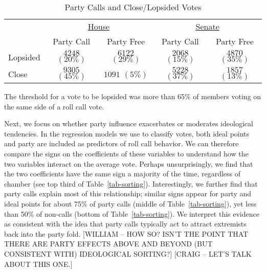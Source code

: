 \documentclass[12pt]{article}
\begin{document}
\begin{table}[!htbp]
\centering
\begin{threeparttable}
\singlespacing
\caption{Party Calls and Close/Lopsided Votes}
\label{tab-close-lop}
\begin{tabular}{l cc|cc}
\hline
&\multicolumn{2}{c}{\underline{House}}&\multicolumn{2}{c}{\underline{Senate}}\\
         & Party Call      & Party Free      & Party Call      & Party Free \\
\hline
Lopsided & $4248$ $(20\%)$ & $6122$ $(29\%)$ & $2068$ $(15\%)$ & $4870$ $(35\%)$ \\
Close    & $9305$ $(45\%)$ & $1091$ $(5\%)$  & $5228$ $(37\%)$ & $1857$ $(13\%)$ \\
\hline
\end{tabular}
\begin{tablenotes}
   \item
   The threshold for a vote to be lopsided was more than 65\% of members voting on the same side of a roll call vote.
 \end{tablenotes}
\end{threeparttable}
\end{table}

Next, we focus on whether party influence exacerbates or moderates ideological tendencies.  In the regression models we use to classify votes, both ideal points and party are included as predictors of roll call behavior.  We can therefore compare the signs on the coefficients of these variables to understand how the two variables interact on the average vote.  Perhaps unsurprisingly, we find that the two coefficients have the same sign a majority of the time, regardless of chamber (see top third of Table~\ref{tab-sorting}).  Interestingly, we further find that party calls explain most of this relationship; similar signs appear for party and ideal points for about 75\% of party calls (middle of Table~\ref{tab-sorting}), yet less than 50\% of non-calls (bottom of Table~\ref{tab-sorting}).  We interpret this evidence as consistent with the idea that party calls typically act to attract extremists back into the party fold.
[WILLIAM -- HOW SO?  ISN'T THE POINT THAT THERE ARE PARTY EFFECTS ABOVE AND BEYOND (BUT CONSISTENT WITH) IDEOLOGICAL SORTING?]
[CRAIG -- LET'S TALK ABOUT THIS ONE.]
\end{document}

